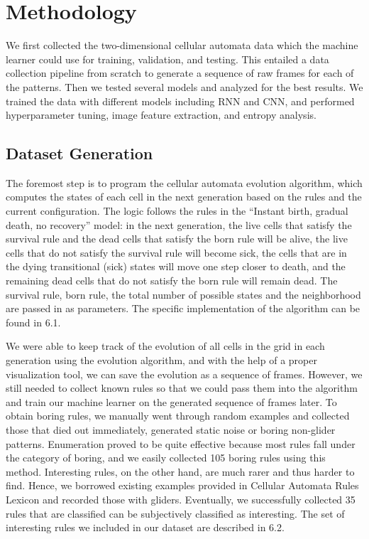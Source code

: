 \documentclass[12pt]{article}
\numberwithin{figure}{section} %
\begin{document}
\newpage
\section{Methodology}
We first collected the two-dimensional cellular automata data which the machine learner could use for training, validation, and testing. This entailed a data collection pipeline from scratch to generate a sequence of raw frames for each of the patterns. Then we tested several models and analyzed for the best results. We trained the data with different models including RNN and CNN, and performed hyperparameter tuning, image feature extraction, and entropy analysis. 

\subsection{Dataset Generation}
The foremost step is to program the cellular automata evolution algorithm, which computes the states of each cell in the next generation based on the rules and the current configuration. The logic follows the rules in the “Instant birth, gradual death, no recovery” model: in the next generation, the live cells that satisfy the survival rule and the dead cells that satisfy the born rule will be alive, the live cells that do not satisfy the survival rule will become sick, the cells that are in the dying transitional (sick) states will move one step closer to death, and the remaining dead cells that do not satisfy the born rule will remain dead. The survival rule, born rule, the total number of possible states and the neighborhood are passed in as parameters. The specific implementation of the algorithm can be found in 6.1. 

We were able to keep track of the evolution of all cells in the grid in each generation using the evolution algorithm, and with the help of a proper visualization tool, we can save the evolution as a sequence of frames. However, we still needed to collect known rules so that we could pass them into the algorithm and train our machine learner on the generated sequence of frames later. To obtain boring rules, we manually went through random examples and collected those that died out immediately, generated static noise or boring non-glider patterns. Enumeration proved to be quite effective because most rules fall under the category of boring, and we easily collected 105 boring rules using this method. Interesting rules, on the other hand, are much rarer and thus harder to find. Hence, we borrowed existing examples provided in Cellular Automata Rules Lexicon and recorded those with gliders. Eventually, we successfully collected 35 rules that are classified can be subjectively classified as interesting. The set of interesting rules we included in our dataset are described in 6.2. 
\end{document}

